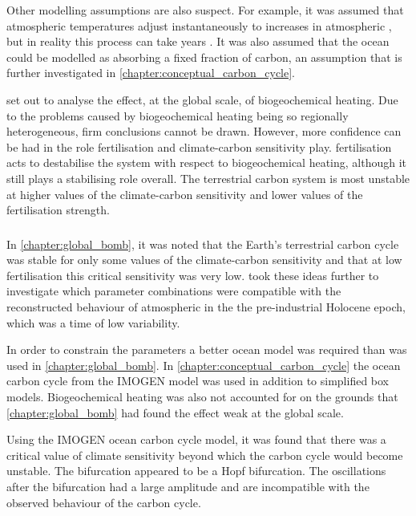 Other modelling assumptions are also suspect. For example, it was assumed that atmospheric temperatures adjust instantaneously to increases in atmospheric , but in
reality this process can take years \parencite{Rugenstein2019}. It was also assumed that the ocean could be modelled as absorbing a fixed fraction of carbon, an assumption that is
further investigated in \cref{chapter:conceptual_carbon_cycle}.

 set out to analyse the effect, at the global scale, of biogeochemical heating. Due to the problems caused by biogeochemical heating
being so regionally heterogeneous, firm conclusions cannot be drawn. However, more confidence can be had in the role  fertilisation and climate-carbon
sensitivity play.  fertilisation acts to destabilise the system with respect to biogeochemical heating, although it still plays a stabilising role
overall. The terrestrial carbon system is most unstable at higher values of the climate-carbon sensitivity and lower values of the  fertilisation strength.

\subsubsection{}

In \cref{chapter:global_bomb}, it was noted that the Earth's terrestrial carbon cycle was stable for only some values of the climate-carbon sensitivity and that at low
 fertilisation this critical sensitivity was very low.  took these ideas further to investigate which parameter combinations
were compatible with the reconstructed behaviour of atmospheric  in the the pre-industrial Holocene epoch, which was a time of low  variability.

In order to constrain the parameters a better ocean model was required than was used in \cref{chapter:global_bomb}. In \cref{chapter:conceptual_carbon_cycle}
the ocean carbon cycle from the IMOGEN model was used in addition to simplified box models. Biogeochemical heating was also not accounted for on the grounds
that \cref{chapter:global_bomb} had found the effect weak at the global scale.

Using the IMOGEN ocean carbon cycle model, it was found that there was a critical value of climate sensitivity beyond which the carbon cycle would become unstable.
The bifurcation appeared to be a Hopf bifurcation. The oscillations after the bifurcation had a large amplitude and are incompatible with the observed behaviour of the
carbon cycle.

